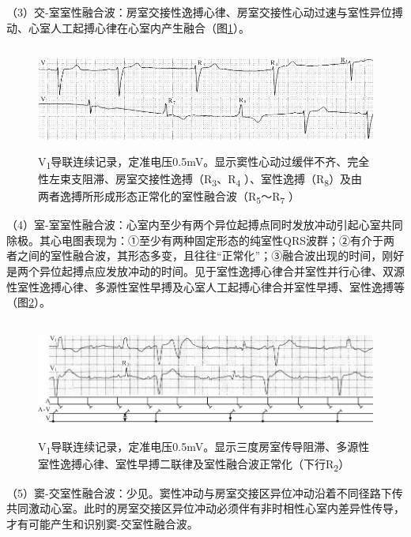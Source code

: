 （3）交-室室性融合波：房室交接性逸搏心律、房室交接性心动过速与室性异位搏动、心室人工起搏心律在心室内产生融合（图\ref{fig3-18}）。

\begin{figure}[!htbp]
 \centering
 \includegraphics[width=5.58333in,height=1.36458in]{./images/Image00068.jpg}
 \captionsetup{justification=centering}
 \caption{V\textsubscript{1}导联连续记录，定准电压0.5mV。显示窦性心动过缓伴不齐、完全性左束支阻滞、房室交接性逸搏（R\textsubscript{3}、R\textsubscript{4} ）、室性逸搏（R\textsubscript{8}）及由两者逸搏所形成形态正常化的室性融合波（R\textsubscript{5}～R\textsubscript{7} ）}
 \label{fig3-18}
  \end{figure} 


（4）室-室室性融合波：心室内至少有两个异位起搏点同时发放冲动引起心室共同除极。其心电图表现为：①至少有两种固定形态的纯室性QRS波群；②有介于两者之间的室性融合波，其形态多变，且往往“正常化”；③融合波出现的时间，刚好是两个异位起搏点应发放冲动的时间。见于室性逸搏心律合并室性并行心律、双源性室性逸搏心律、多源性室性早搏及心室人工起搏心律合并室性早搏、室性逸搏等（图\ref{fig3-19}）。

\begin{figure}[!htbp]
 \centering
 \includegraphics[width=5.78125in,height=1.51042in]{./images/Image00069.jpg}
 \captionsetup{justification=centering}
 \caption{V\textsubscript{1}导联连续记录，定准电压0.5mV。显示三度房室传导阻滞、多源性室性逸搏心律、室性早搏二联律及室性融合波正常化（下行R\textsubscript{2}）}
 \label{fig3-19}
  \end{figure} 


（5）窦-交室性融合波：少见。窦性冲动与房室交接区异位冲动沿着不同径路下传共同激动心室。此时的房室交接区异位冲动必须伴有非时相性心室内差异性传导，才有可能产生和识别窦-交室性融合波。

